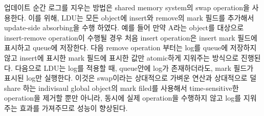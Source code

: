 













\fi


\ifkor
업데이트 순간 로그를 지우는 방법은 shared memory system의 swap operation을 사용한다.
이를 위해, LDU는 모든 object에 insert와 remove의 mark 필드를 추가해서 update-side
absorbing을 수행 하였다.
예를 들어 만약 A라는 object를 대상으로 insert-remove operation이 수행될 경우 처음 insert operation은
insert mark 필드에 표시하고 queue에 저장한다.
다음 remove operation 부터는 log를 queue에 저장하지 않고 insert에 표시한 mark 필드에 표시한 값만
atomic하게 지워주는 방식으로 진행된다.
다음으로 LDU는 log를 적용할 때, queue안에 log가 존재하더라도, mark 필드가 표시된 log만 실행한다.
이것은 swap이라는 상대적으로 가벼운 연산과 상대적으로 덜 share 하는 indivisaul global object의 mark filed를
사용해서 time-sensitive한 operation을 제거할 뿐만 아니라, 동시에 실제 operation을 수행하지 않고 log를 지워주는
효과를 가져주므로 성능이 향상된다. 
\else









